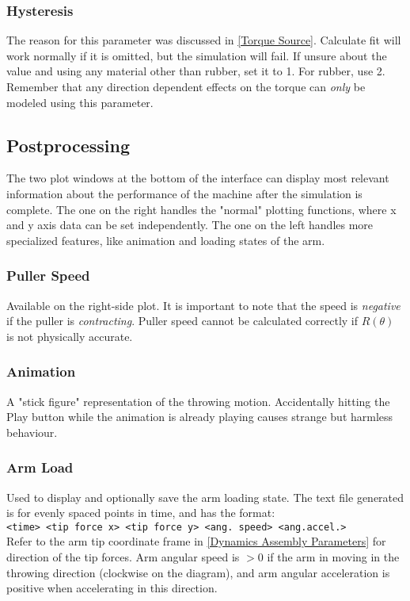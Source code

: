 \documentclass{article}
\begin{document}
\subsubsection{Hysteresis}
The reason for this parameter was discussed in \ref{Torque Source}. Calculate fit will work normally if it is omitted, but the simulation will fail. If unsure about the value and using any material other than rubber, set it to 1. For rubber, use 2. Remember that any direction dependent effects on the torque can \emph{only} be modeled using this parameter. 

\subsection{Postprocessing}
The two plot windows at the bottom of the interface can display most relevant information about the performance of the machine after the simulation is complete. The one on the right handles the "normal" plotting functions, where x and y axis data can be set independently. The one on the left handles more specialized features, like animation and loading states of the arm.
\subsubsection{Puller Speed} Available on the right-side plot. It is important to note that the speed is \emph{negative} if the puller is \emph{contracting}. Puller speed cannot be calculated correctly if $R(\theta)$ is not physically accurate.
\subsubsection{Animation} A "stick figure" representation of the throwing motion. Accidentally hitting the Play button while the animation is already playing causes strange but harmless behaviour.
\subsubsection{Arm Load} Used to display and optionally save the arm loading state. The text file generated is for evenly spaced points in time, and has the format:\\ \verb|<time> <tip force x> <tip force y> <ang. speed> <ang.accel.>|\\
Refer to the arm tip coordinate frame in \ref{Dynamics Assembly Parameters} for direction of the tip forces. Arm angular speed is $>0$ if the arm in moving in the throwing direction (clockwise on the diagram), and arm angular acceleration is positive when accelerating in this direction.
\end{document}

